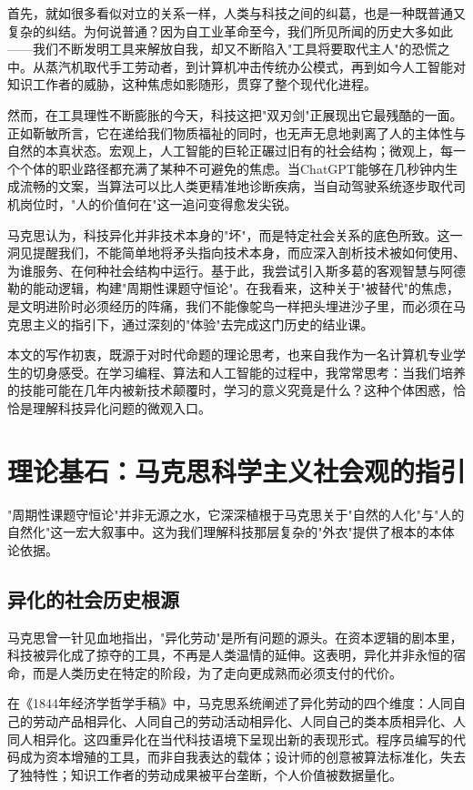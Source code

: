 \documentclass[a4paper,12pt]{ctexart}
\begin{document}
首先，就如很多看似对立的关系一样，人类与科技之间的纠葛，也是一种既普通又复杂的纠结。为何说普通？因为自工业革命至今，我们所见所闻的历史大多如此——我们不断发明工具来解放自我，却又不断陷入"工具将要取代主人"的恐慌之中。从蒸汽机取代手工劳动者，到计算机冲击传统办公模式，再到如今人工智能对知识工作者的威胁，这种焦虑如影随形，贯穿了整个现代化进程。

然而，在工具理性不断膨胀的今天，科技这把"双刃剑"正展现出它最残酷的一面。正如靳敏所言，它在递给我们物质福祉的同时，也无声无息地剥离了人的主体性与自然的本真状态。宏观上，人工智能的巨轮正碾过旧有的社会结构；微观上，每一个个体的职业路径都充满了某种不可避免的焦虑。当ChatGPT能够在几秒钟内生成流畅的文案，当算法可以比人类更精准地诊断疾病，当自动驾驶系统逐步取代司机岗位时，"人的价值何在"这一追问变得愈发尖锐。

马克思认为，科技异化并非技术本身的"坏"，而是特定社会关系的底色所致。这一洞见提醒我们，不能简单地将矛头指向技术本身，而应深入剖析技术被如何使用、为谁服务、在何种社会结构中运行。基于此，我尝试引入斯多葛的客观智慧与阿德勒的能动逻辑，构建"周期性课题守恒论"。在我看来，这种关于"被替代"的焦虑，是文明进阶时必须经历的阵痛，我们不能像鸵鸟一样把头埋进沙子里，而必须在马克思主义的指引下，通过深刻的"体验"去完成这门历史的结业课。

本文的写作初衷，既源于对时代命题的理论思考，也来自我作为一名计算机专业学生的切身感受。在学习编程、算法和人工智能的过程中，我常常思考：当我们培养的技能可能在几年内被新技术颠覆时，学习的意义究竟是什么？这种个体困惑，恰恰是理解科技异化问题的微观入口。

\section{理论基石：马克思科学主义社会观的指引}

"周期性课题守恒论"并非无源之水，它深深植根于马克思关于"自然的人化"与"人的自然化"这一宏大叙事中。这为我们理解科技那层复杂的"外衣"提供了根本的本体论依据。

\subsection{异化的社会历史根源}

马克思曾一针见血地指出，"异化劳动"是所有问题的源头。在资本逻辑的剧本里，科技被异化成了掠夺的工具，不再是人类温情的延伸。这表明，异化并非永恒的宿命，而是人类历史在特定的阶段，为了走向更成熟而必须支付的代价。

在《1844年经济学哲学手稿》中，马克思系统阐述了异化劳动的四个维度：人同自己的劳动产品相异化、人同自己的劳动活动相异化、人同自己的类本质相异化、人同人相异化。这四重异化在当代科技语境下呈现出新的表现形式。程序员编写的代码成为资本增殖的工具，而非自我表达的载体；设计师的创意被算法标准化，失去了独特性；知识工作者的劳动成果被平台垄断，个人价值被数据量化。
\end{document}
